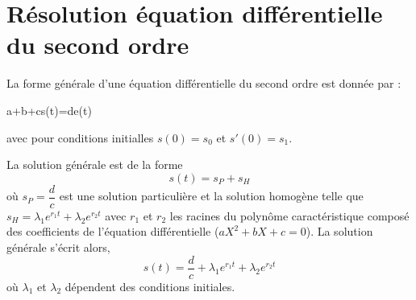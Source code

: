 \section[Second ordre]{Résolution équation différentielle du second ordre}
La forme générale d'une équation différentielle du second ordre est
donnée par : 
\begin{bequation}
    a+b+cs(t)=d\cdot e(t)
\end{bequation}
avec pour conditions initialles $s(0)=s_0$ et $s'(0)=s_1$.

La solution générale est de la forme 
\[
    s(t)=s_P+s_H
\]
où $s_P=\dfrac{d}{c}$ est une solution particulière et la solution homogène 
telle que $s_H=\lambda_1 e^{r_1 t}+
\lambda_2 e^{r_2 t}$ avec $r_1$ et $r_2$ les racines du polynôme 
caractéristique composé des coefficients de l'équation différentielle 
($aX^2+bX+c=0$).
La solution générale s'écrit alors,
\[
    s(t)=\dfrac{d}{c}+\lambda_1 e^{r_1 t}+\lambda_2 e^{r_2 t}
\]
où $\lambda_1$ et $\lambda_2$ dépendent des conditions initiales. 

